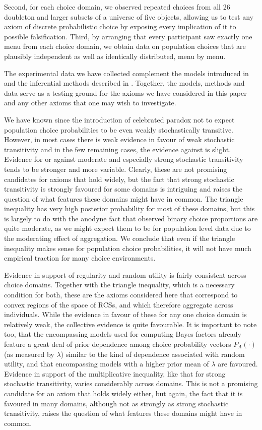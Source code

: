 \documentclass[11pt,letter]{article}
\newcommand{\menu}{menu}
\begin{document}
Second, for each choice domain, we observed repeated choices from all 26 doubleton and larger subsets of a universe of five objects, allowing us to test any axiom of discrete probabilistic choice by exposing every implication of it to possible falsification.
Third, by arranging that every participant saw exactly one \menu{} from each choice domain, we obtain data on population choices that are plausibly independent as well as identically distributed, \menu{} by \menu{}.

The experimental data we have collected complement the models introduced in  and the inferential methods described in .
Together, the models, methods and data serve as a testing ground for the axioms we have considered in this paper and any other axioms that one may wish to investigate.

We have known since the introduction of  celebrated paradox not to expect population choice probabilities to be even weakly stochastically transitive.
However, in most cases there is weak evidence in favour of weak stochastic transitivity and in the few remaining cases, the evidence against is slight.
Evidence for or against moderate and especially strong stochastic transitivity tends to be stronger and more variable.
Clearly, these are not promising candidates for axioms that hold widely, but the fact that strong stochastic transitivity is strongly favoured for some domains is intriguing and raises the question of what features these domains might have in common.
The triangle inequality has very high posterior probability for most of these domains, but this is largely to do with the anodyne fact that observed binary choice proportions are quite moderate, as we might expect them to be for population level data due to the moderating effect of aggregation.
We conclude that even if the triangle inequality makes sense for population choice probabilities, it will not have much empirical traction for many choice environments.

Evidence in support of regularity and random utility is fairly consistent across choice domains.
Together with the triangle inequality, which is a necessary condition for both, these are the axioms considered here that correspond to convex regions of the space of RCSs, and which therefore aggregate across individuals.
While the evidence in favour of these for any one choice domain is relatively weak, the collective evidence is quite favourable.
It is important to note too, that the encompassing models used for computing Bayes factors already feature a great deal of prior dependence among choice probability vectors $P_A(\cdot)$ (as measured by $\lambda$) similar to the kind of dependence associated with random utility, and that encompassing models with a higher prior mean of $\lambda$ are favoured.
Evidence in support of the multiplicative inequality, like that for strong stochastic transitivity, varies considerably across domains.
This is not a promising candidate for an axiom that holds widely either, but again, the fact that it is favoured in many domains, although not as strongly as strong stochastic transitivity, raises the question of what features these domains might have in common.
\end{document}
